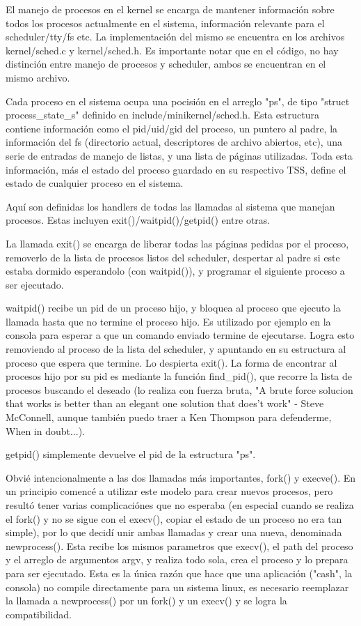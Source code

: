 El manejo de procesos en el kernel se encarga de mantener información sobre
todos los procesos actualmente en el sistema, información relevante para el
scheduler/tty/fs etc. La implementación del mismo se encuentra en los archivos
kernel/sched.c y kernel/sched.h. Es importante notar que en el código, no hay
distinción entre manejo de procesos y scheduler, ambos se encuentran en el
mismo archivo.

Cada proceso en el sistema ocupa una pocisión en el arreglo "ps", de tipo
"struct process\_state\_s" definido en include/minikernel/sched.h. Esta
estructura contiene información como el pid/uid/gid del proceso, un puntero al
padre, la información del fs (directorio actual, descriptores de archivo
abiertos, etc), una serie de entradas de manejo de listas, y una lista de
páginas utilizadas. Toda esta información, más el estado del proceso guardado
en su respectivo TSS, define el estado de cualquier proceso en el sistema.

Aquí son definidas los handlers de todas las llamadas al sistema que manejan
procesos. Estas incluyen exit()/waitpid()/getpid() entre otras.

La llamada exit() se encarga de liberar todas las páginas pedidas por el
proceso, removerlo de la lista de procesos listos del scheduler, despertar al
padre si este estaba dormido esperandolo (con waitpid()), y programar el
siguiente proceso a ser ejecutado.

waitpid() recibe un pid de un proceso hijo, y bloquea al proceso que ejecuto la
llamada hasta que no termine el proceso hijo. Es utilizado por ejemplo en la
consola para esperar a que un comando enviado termine de ejecutarse. Logra esto
removiendo al proceso de la lista del scheduler, y apuntando en su estructura
al proceso que espera que termine. Lo despierta exit(). La forma de encontrar
al procesos hijo por su pid es mediante la función find\_pid(), que recorre la
lista de procesos buscando el deseado (lo realiza con fuerza bruta, "A brute
force solucion that works is better than an elegant one solution that does't
work" - Steve McConnell, aunque también puedo traer a Ken Thompson para
defenderme, When in doubt...).

getpid() simplemente devuelve el pid de la estructura "ps".

Obvié intencionalmente a las dos llamadas más importantes, fork() y execve().
En un principio comencé a utilizar este modelo para crear nuevos procesos, pero
resultó tener varias complicaciónes que no esperaba (en especial cuando se
realiza el fork() y no se sigue con el execv(), copiar el estado de un proceso
no era tan simple), por lo que decidí unir ambas llamadas y crear una nueva,
denominada newprocess(). Esta recibe los mismos parametros que execv(), el path
del proceso y el arreglo de argumentos argv, y realiza todo sola, crea el
proceso y lo prepara para ser ejecutado. Esta es la única razón que hace que
una aplicación ("cash", la consola) no compile directamente para un sistema
linux, es necesario reemplazar la llamada a newprocess() por un fork() y un
execv() y se logra la compatibilidad.

